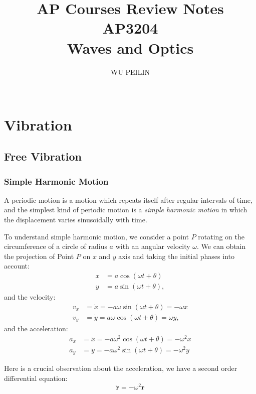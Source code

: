 \documentclass[openany]{book}
\title{AP Courses Review Notes\\AP3204\\Waves and Optics} %
\author{WU PEILIN \\ ~ \\
} %
\begin{document}
\frontmatter
\maketitle
\tableofcontents
\clearpage

\mainmatter
\chapter{Vibration}
\section{Free Vibration}
\subsection{Simple Harmonic Motion}
A periodic motion is a motion which repeats itself after regular intervals of time, and the simplest kind of periodic motion is a \emph{simple harmonic motion} in which the displacement varies sinusoidally with time.

To understand simple harmonic motion, we consider a point $P$ rotating on the circumference of a circle of radius $a$ with an angular velocity $\omega $.
We can obtain the projection of Point $P$ on $x$ and $y$ axis and taking the initial phases into account:
\begin{align*}
x&=a\cos (\omega t+\theta)\\
y&=a\sin (\omega t+\theta),
\end{align*}
and the velocity:
\begin{align*}
v_x&=\dot{x}=-a\omega \sin (\omega t+\theta)=-\omega x\\
v_y&=\dot{y}=a\omega \cos (\omega t+\theta)=\omega y,
\end{align*}
and the acceleration:
\begin{align*}
a_x&=\ddot{x}=-a\omega ^2\cos (\omega t+\theta)=-\omega ^2x\\
a_y&=\ddot{y}=-a\omega ^2\sin (\omega t+\theta)=-\omega ^2y
\end{align*}

Here is a crucial observation about the acceleration, we have a second order differential equation:
\begin{equation}\label{eq:1}
\ddot{\mathbf{r}}=-\omega ^2\mathbf{r}
\end{equation}
\end{document}
